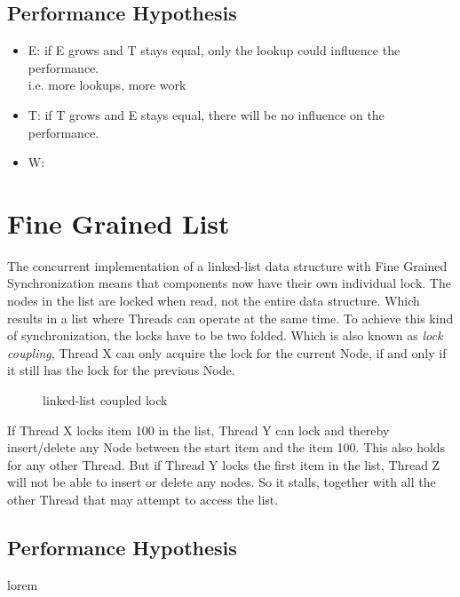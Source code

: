 \documentclass[10pt,a4paper]{article}
\begin{document}
\subsection{Performance Hypothesis}
\begin{itemize}
 \item E:   if E grows and T stays equal, only the lookup could influence the
 performance. \\ i.e. more lookups, more work
 \item T:   if T grows and E stays equal, there will be no influence on the performance.
 \item W:   
\end{itemize}

\section{Fine Grained List}
The concurrent implementation of a linked-list data structure with Fine Grained
Synchronization means that components now have their own individual lock. The
nodes in the list are locked when read, not the entire data structure. Which
results in a list where Threads can operate at the same time. To achieve this
kind of synchronization, the locks have to be two folded. Which is also known 
as \emph{lock coupling}, Thread X can only acquire the lock for the current 
Node, if and only if it still has the lock for the previous Node.
\begin{figure}[h]
\centerline{
}
\caption{linked-list coupled lock}
\end{figure}
If Thread X locks item 100 in the list, Thread Y can lock and thereby
insert/delete any Node between the start item and the item 100. This
also holds for any other Thread. But if Thread Y locks the first item in the
list, Thread Z will not be able to insert or delete any nodes. So it stalls,
together with all the other Thread that may attempt to access the list.

\subsection{Performance Hypothesis}
lorem
\end{document}
